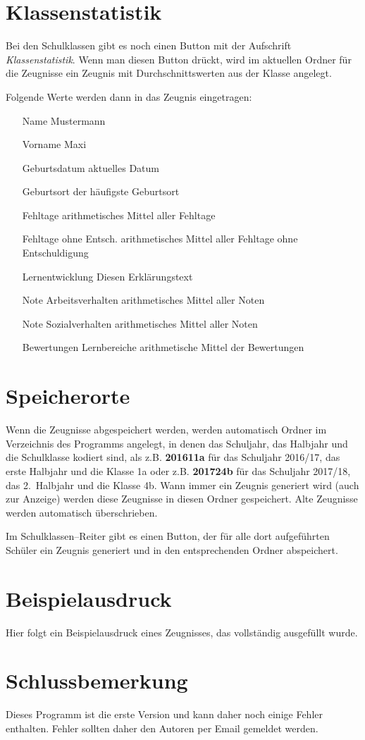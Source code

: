 \documentclass[a4paper,notitlepage,parskip]{scrartcl}
\newcommand\ott{\normalfont\ttfamily}
\begin{document}
\section{Klassenstatistik}
Bei den Schulklassen gibt es noch einen Button mit der Aufschrift \emph{Klassenstatistik}.
Wenn man diesen Button drückt, wird im aktuellen Ordner für die Zeugnisse ein Zeugnis mit Durchschnittswerten aus der Klasse angelegt.

Folgende Werte werden dann in das Zeugnis eingetragen:

\begin{itemize}
\setlength{\itemindent}{3.5cm}
\item[Name] Mustermann
\item[Vorname] Maxi
\item[Geburtsdatum] aktuelles Datum
\item[Geburtsort] der häufigste Geburtsort
\item[Fehltage] arithmetisches Mittel aller Fehltage
\item[Fehltage ohne Entsch.] arithmetisches Mittel aller Fehltage ohne Entschuldigung
\item[Lernentwicklung] Diesen Erklärungstext
\item[Note Arbeitsverhalten] arithmetisches Mittel aller Noten
\item[Note Sozialverhalten] arithmetisches Mittel aller Noten
\item[Bewertungen Lernbereiche] arithmetische Mittel der Bewertungen
\end{itemize}
\section{Speicherorte}
Wenn die Zeugnisse abgespeichert werden, werden automatisch Ordner im Verzeichnis des Programms angelegt, in denen das Schuljahr, das Halbjahr und die Schulklasse kodiert sind, als z.B.
{\ott\normalfont\bfseries 201611a} für das Schuljahr 2016/17, das erste Halbjahr und die Klasse 1a oder z.B. {\ott\normalfont\bfseries 201724b}
für das Schuljahr 2017/18, das 2.~Halbjahr und die Klasse 4b.
Wann immer ein Zeugnis generiert wird (auch zur Anzeige) werden diese Zeugnisse in diesen Ordner gespeichert. Alte Zeugnisse werden automatisch überschrieben.

Im Schulklassen--Reiter gibt es einen Button, der für alle dort aufgeführten Schüler ein Zeugnis generiert und in den entsprechenden Ordner abspeichert.

\section{Beispielausdruck}
Hier folgt ein Beispielausdruck eines Zeugnisses, das vollständig ausgefüllt wurde.



\section{Schlussbemerkung}
Dieses Programm ist die erste Version und kann daher noch einige Fehler enthalten.
Fehler sollten daher den Autoren per Email gemeldet werden.
\end{document}

